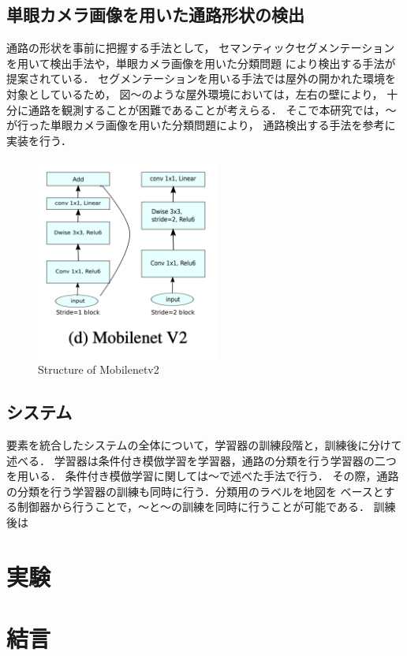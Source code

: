 \documentclass{jarticle}
\begin{document}
\subsection{単眼カメラ画像を用いた通路形状の検出}
通路の形状を事前に把握する手法として，
セマンティックセグメンテーションを用いて検出手法や，単眼カメラ画像を用いた分類問題
により検出する手法が提案されている．
セグメンテーションを用いる手法では屋外の開かれた環境を対象としているため，
図〜のような屋外環境においては，左右の壁により，
十分に通路を観測することが困難であることが考えらる．
そこで本研究では，〜が行った単眼カメラ画像を用いた分類問題により，
通路検出する手法を参考に実装を行う．
\begin{figure}[h]
  \centering
   \includegraphics[width=60mm]{./figs/mobilenetv2.png}
   \vspace*{-4mm}
   \caption{Structure of Mobilenetv2}
   \label{fig:mobilenetv2}
 \end{figure}
\subsection{システム}
要素を統合したシステムの全体について，学習器の訓練段階と，訓練後に分けて述べる．
学習器は条件付き模倣学習を学習器，通路の分類を行う学習器の二つを用いる．
条件付き模倣学習に関しては〜で述べた手法で行う．
その際，通路の分類を行う学習器の訓練も同時に行う．分類用のラベルを地図を
ベースとする制御器から行うことで，〜と〜の訓練を同時に行うことが可能である．
訓練後は

\section{実験}
\section{結言}
\end{document}
